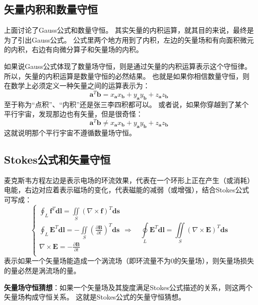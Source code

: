 \subsection{矢量内积和数量守恒}

上面讨论了Gauss公式和数量守恒。
其实矢量的内积运算，就其目的来说，最终是为了引出Gauss公式。
公式里两个地方用到了内积，左边的矢量场和有向面积微元的内积，右边有向微分算子和矢量场的内积。

如果说Gauss公式体现了数量场守恒，则是通过矢量的内积运算表示这个守恒律。
所以，矢量的内积运算是数量守恒的必然结果。
也就是如果你相信数量守恒，则在数学上必须定义一种矢量之间的运算表示为：
\[
\boldsymbol{a}^T\boldsymbol{b}=x_{\boldsymbol{a}}x_{\boldsymbol{b}}+y_{\boldsymbol{a}}y_{\boldsymbol{b}}+z_{\boldsymbol{a}}z_{\boldsymbol{b}}
\]
至于称为“点积”、“内积”还是张三李四积都可以。
或者说，如果你穿越到了某个平行宇宙，发现那边也有矢量，但是很奇怪：
\[
\boldsymbol{a}^T\boldsymbol{b}\ne x_{\boldsymbol{a}}x_{\boldsymbol{b}}+y_{\boldsymbol{a}}y_{\boldsymbol{b}}+z_{\boldsymbol{a}}z_{\boldsymbol{b}}
\]
这就说明那个平行宇宙不遵循数量场守恒。

\subsection{Stokes公式和矢量守恒}

麦克斯韦方程左边是表示电场的环流效果，代表在一个环形上正在产生（或消耗）电能，右边对应着表示磁场的变化，代表磁能的减弱（或增强），结合Stokes公式可写成：
\[
\begin{cases}
	\oint_L{\boldsymbol{f}^T\boldsymbol{dl}}=\iint\limits_S{\left( \nabla \times \boldsymbol{f} \right) ^T\boldsymbol{ds}}\\
	\oint_L{\boldsymbol{E}^T\boldsymbol{dl}}=-\iint\limits_S{\left( \frac{\partial \boldsymbol{B}}{\partial t} \right) ^T\boldsymbol{ds}}\\
	\nabla \times \boldsymbol{E}=-\frac{\partial \boldsymbol{B}}{\partial t}\\
\end{cases} \Rightarrow \quad \oint\limits_L{\boldsymbol{E}^T\boldsymbol{dl}}=\iint\limits_S{\left( \nabla \times \boldsymbol{E} \right) ^T\boldsymbol{ds}}
\]
表示如果一个矢量场能造成一个涡流场（即环流量不为0的矢量场），则矢量场损失的量必然是涡流场的量。

\begin{tcolorbox}
{\bf 矢量场守恒猜想}：如果一个矢量场及其旋度满足Stokes公式描述的关系，则这两个矢量场构成守恒关系。
这就是Stokes公式的矢量守恒猜想。
\end{tcolorbox}


